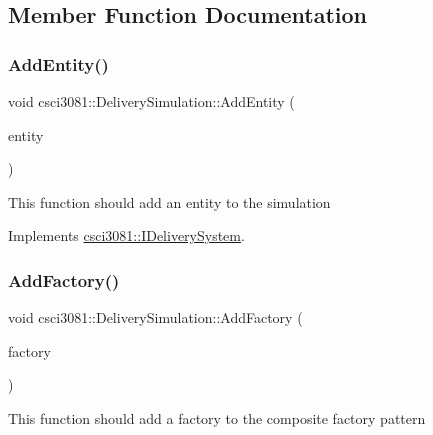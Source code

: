 \subsection{Member Function Documentation}
\mbox{\label{classcsci3081_1_1DeliverySimulation_ad8693e6b107599588c4f6f944911d0ed}} 
\subsubsection{\texorpdfstring{Add\+Entity()}{AddEntity()}}
{\footnotesize\ttfamily void csci3081\+::\+Delivery\+Simulation\+::\+Add\+Entity (\begin{DoxyParamCaption}\item[{\hyperlink{classentity__project_1_1IEntity}{I\+Entity} $\ast$}]{entity }\end{DoxyParamCaption})\hspace{0.3cm}{\ttfamily [virtual]}}

This function should add an entity to the simulation 

Implements \hyperlink{classcsci3081_1_1IDeliverySystem_ae8fe57f0627f3429d4a8cea4d910e233}{csci3081\+::\+I\+Delivery\+System}.

\mbox{\label{classcsci3081_1_1DeliverySimulation_a25b9f689b5ec1c831776d6160593e605}} 
\subsubsection{\texorpdfstring{Add\+Factory()}{AddFactory()}}
{\footnotesize\ttfamily void csci3081\+::\+Delivery\+Simulation\+::\+Add\+Factory (\begin{DoxyParamCaption}\item[{\hyperlink{classentity__project_1_1IEntityFactory}{I\+Entity\+Factory} $\ast$}]{factory }\end{DoxyParamCaption})\hspace{0.3cm}{\ttfamily [virtual]}}

This function should add a factory to the composite factory pattern 

